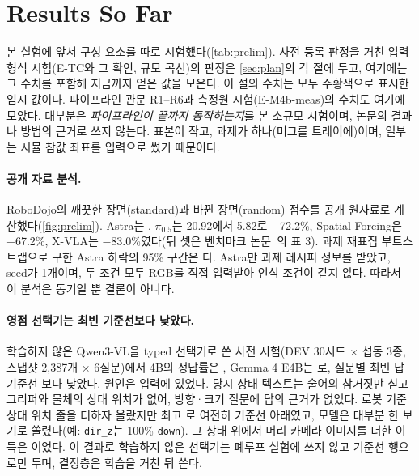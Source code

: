 \section{Results So Far}
\label{sec:prelim}

본 실험에 앞서 구성 요소를 따로 시험했다(\cref{tab:prelim}). 사전 등록 판정을 거친 입력 형식 시험(E-TC와 그 확인, 규모 곡선)의 판정은 \cref{sec:plan}의 각 절에 두고, 여기에는 그 수치를 포함해 지금까지 얻은 값을 모은다. 이 절의 수치는 모두 주황색으로 표시한 임시 값이다. 파이프라인 관문 R1--R6과 측정원 시험(E-M4b-meas)의 수치도 여기에 모았다. 대부분은 \emph{파이프라인이 끝까지 동작하는지}를 본 소규모 시험이며, 논문의 결과나 방법의 근거로 쓰지 않는다. 표본이 작고, 과제가 하나(머그를 트레이에)이며, 일부는 시뮬 참값 좌표를 입력으로 썼기 때문이다.

\paragraph{공개 자료 분석.}
RoboDojo의 깨끗한 장면(standard)과 바뀐 장면(random) 점수를 공개 원자료로 계산했다(\cref{fig:prelim}). Astra는 , $\pi_{0.5}$는 20.92에서 5.82로 $-$72.2\%, Spatial Forcing은 $-$67.2\%, X-VLA는 $-$83.0\%였다(뒤 셋은 벤치마크 논문~\cite{robodojobench2026}의 표 3). 과제 재표집 부트스트랩으로 구한 Astra 하락의 95\% 구간은 다. Astra만 과제 레시피 정보를 받았고, seed가 1개이며, 두 조건 모두 RGB를 직접 입력받아 인식 조건이 같지 않다. 따라서 이 분석은 동기일 뿐 결론이 아니다.



\paragraph{영점 선택기는 최빈 기준선보다 낮았다.}
학습하지 않은 Qwen3-VL을 typed 선택기로 쓴 사전 시험(DEV 30시드 $\times$ 섭동 3종, 스냅샷 2,387개 $\times$ 6질문)에서 4B의 정답률은 , Gemma 4 E4B는 로, 질문별 최빈 답 기준선 보다 낮았다. 원인은 입력에 있었다. 당시 상태 텍스트는 술어의 참거짓만 싣고 그리퍼와 물체의 상대 위치가 없어, 방향·크기 질문에 답의 근거가 없었다. 로봇 기준 상대 위치 줄을 더하자  올랐지만 최고 로 여전히 기준선 아래였고, 모델은 대부분 한 보기로 쏠렸다(예: \texttt{dir\_z}는 100\% \texttt{down}). 그 상태 위에서 머리 카메라 이미지를 더한 이득은 이었다. 이 결과로 학습하지 않은 선택기는 폐루프 실험에 쓰지 않고 기준선 행으로만 두며, 결정층은 학습을 거친 뒤 쓴다.

